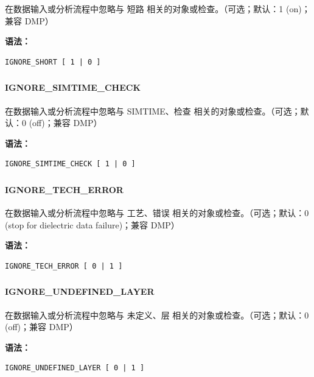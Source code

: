 在数据输入或分析流程中忽略与 短路 相关的对象或检查。（可选；默认：1 (on)；兼容 DMP）

\textbf{语法：}
\begin{lstlisting}
IGNORE_SHORT [ 1 | 0 ]
\end{lstlisting}

\subsubsection{}
\paragraph*{IGNORE_SIMTIME_CHECK}

在数据输入或分析流程中忽略与 SIMTIME、检查 相关的对象或检查。（可选；默认：0 (off)；兼容 DMP）

\textbf{语法：}
\begin{lstlisting}
IGNORE_SIMTIME_CHECK [ 1 | 0 ]
\end{lstlisting}

\subsubsection{}
\paragraph*{IGNORE_TECH_ERROR}

在数据输入或分析流程中忽略与 工艺、错误 相关的对象或检查。（可选；默认：0 (stop for dielectric data failure)；兼容 DMP）

\textbf{语法：}
\begin{lstlisting}
IGNORE_TECH_ERROR [ 0 | 1 ]
\end{lstlisting}

\subsubsection{}
\paragraph*{IGNORE_UNDEFINED_LAYER}

在数据输入或分析流程中忽略与 未定义、层 相关的对象或检查。（可选；默认：0 (off)；兼容 DMP）

\textbf{语法：}
\begin{lstlisting}
IGNORE_UNDEFINED_LAYER [ 0 | 1 ]
\end{lstlisting}

